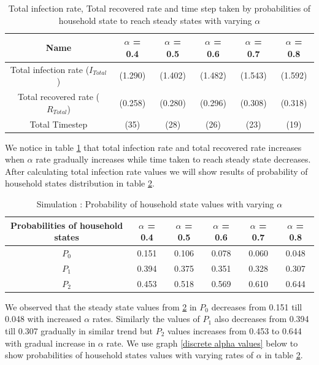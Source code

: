 \documentclass[paper=a4, fontsize=11pt, twoside, BCOR=12mm, parskip=full, listof=totoc]{scrreprt}
\begin{document}
{\begin{table}[H]
	\centering 
	\caption{Total infection rate, Total recovered rate and time step taken by probabilities of household state to reach steady states with varying $\alpha$}
	\label{tab Total infection rate and total timestep reached for Probabilities of Household to reach steady states varying alpha}
	\begin{tabular}{cccccc}
	\toprule
     Name & $\alpha$ = 0.4  & $\alpha$ = 0.5 & $\alpha$ = 0.6 & $\alpha$ = 0.7 & $\alpha$ = 0.8 \\
     \midrule
     Total infection rate ($I_{Total}$) & (1.290) & (1.402) & (1.482) & (1.543) & (1.592) \\
     Total recovered rate ($R_{Total}$) & (0.258) & (0.280) & (0.296) & (0.308) & (0.318) \\
	 Total Timestep & (35) & (28) & (26) & (23) & (19) \\
	\bottomrule
	\end{tabular}
\end{table}

We notice in table \ref{tab Total infection rate and total timestep reached for Probabilities of Household to reach steady states varying alpha} that total infection rate and total recovered rate increases when $\alpha$ rate gradually increases while time taken to reach steady state decreases. After calculating total infection rate values we will show results of probability of household states distribution in table \ref{tab Probability of Household state values varying alpha}. 

\begin{table}[H]
	\centering 
	\caption{Simulation : Probability of household state values with varying $\alpha$}
	\label{tab Probability of Household state values varying alpha}
	\begin{tabular}{cccccc}
	\toprule
     Probabilities of household states & $\alpha$ = 0.4  & $\alpha$ = 0.5 & $\alpha$ = 0.6 & $\alpha$ = 0.7 & $\alpha$ = 0.8 \\
     \midrule
	 $P_0$ & 0.151  & 0.106 & 0.078 & 0.060  & 0.048 \\
	 $P_1$ & 0.394  & 0.375 & 0.351 & 0.328  & 0.307 \\
	 $P_2$ & 0.453  & 0.518 & 0.569 & 0.610  & 0.644 \\
	\bottomrule
	\end{tabular}
\end{table}
We observed that the steady state values from \ref{tab Probability of Household state values varying alpha} in $P_0$ decreases from 0.151 till 0.048 with increased $\alpha$ rates. Similarly the values of $P_1$ also decreases from 0.394 till 0.307 gradually in similar trend but $P_2$ values increases from 0.453 to 0.644 with gradual increase in $\alpha$ rate.
We use graph \ref{discrete alpha values} below to show probabilities of household states values with varying rates of $\alpha$ in table \ref{tab Probability of Household state values varying alpha}. 

}
\end{document}
